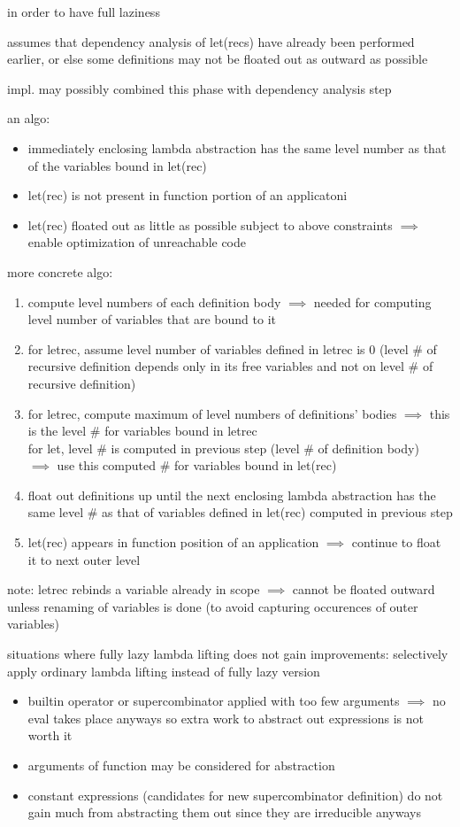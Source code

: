 \documentclass[8pt]{extarticle}
\begin{document}
\begin{multicols*}{2}
in order to have full laziness

assumes that dependency analysis of let(recs) have already been performed earlier, or else some definitions may not be floated out as outward as possible

impl. may possibly combined this phase with dependency analysis step

an algo:
\begin{itemize}
\item immediately enclosing lambda abstraction has the same level number as that of the variables bound in let(rec)
\item let(rec) is not present in function portion of an applicatoni
\item let(rec) floated out as little as possible subject to above constraints $\implies$ enable optimization of unreachable code
\end{itemize}

more concrete algo:
\begin{enumerate}
\item compute level numbers of each definition body $\implies$ needed for computing level number of variables that are bound to it
\item for letrec, assume level number of variables defined in letrec is 0 (level \# of recursive definition depends only in its free variables and not on level \# of recursive definition)
\item for letrec, compute maximum of level numbers of definitions' bodies $\implies$ this is the level \# for variables bound in letrec\\
  for let, level \# is computed in previous step (level \# of definition body)\\
  $\implies$ use this computed \# for variables bound in let(rec)
\item float out definitions up until the next enclosing lambda abstraction has the same level \# as that of variables defined in let(rec) computed in previous step
\item let(rec) appears in function position of an application $\implies$ continue to float it to next outer level
\end{enumerate}

note: letrec rebinds a variable already in scope $\implies$ cannot be floated outward unless renaming of variables is done (to avoid capturing occurences of outer variables)

situations where fully lazy lambda lifting does not gain improvements: selectively apply ordinary lambda lifting instead of fully lazy version
\begin{itemize}
\item builtin operator or supercombinator applied with too few arguments $\implies$ no eval takes place anyways so extra work to abstract out expressions is not worth it
\item arguments of function may be considered for abstraction
\item constant expressions (candidates for new supercombinator definition) do not gain much from abstracting them out since they are irreducible anyways
\end{itemize}


\end{multicols*}
\end{document}

